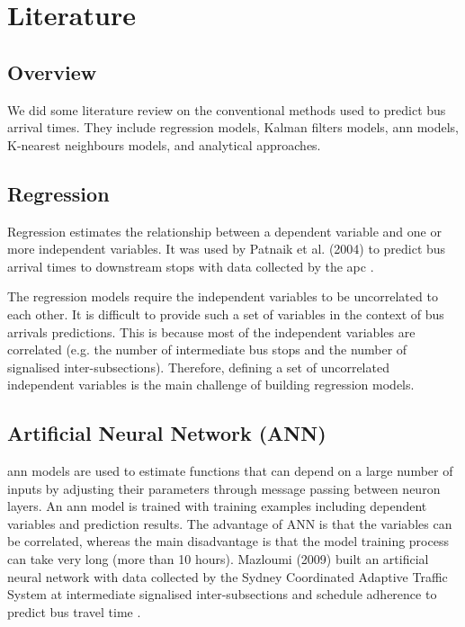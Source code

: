 \section{Literature}
\label{sec:literature}
\subsection{Overview}
\par We did some literature review on the conventional methods used to predict bus arrival times. They include regression models, Kalman filters models, \acrfull{ann} models, K-nearest neighbours models, and analytical approaches.

\subsection{Regression}
\par Regression estimates the relationship between a dependent variable and one or more independent variables. It was used by Patnaik et al. (2004) to predict bus arrival times to downstream stops with data collected by the \acrfull{apc} \cite{regression_models}.

\par The regression models require the independent variables to be uncorrelated to each other. It is difficult to provide such a set of variables in the context of bus arrivals predictions. This is because most of the independent variables are correlated (e.g. the number of intermediate bus stops and the number of signalised inter-subsections). Therefore, defining a set of uncorrelated independent variables is the main challenge of building regression models.

\subsection{Artificial Neural Network (ANN)}
\par \acrshort{ann} models are used to estimate functions that can depend on a large number of inputs by adjusting their parameters through message passing between neuron layers. An \acrshort{ann} model is trained with training examples including dependent variables and prediction results. The advantage of ANN is that the variables can be correlated, whereas the main disadvantage is that the model training process can take very long (more than 10 hours). Mazloumi (2009) built an artificial neural network with data collected by the Sydney Coordinated Adaptive Traffic System at intermediate signalised inter-subsections and schedule adherence to predict bus travel time \cite{ann}.

